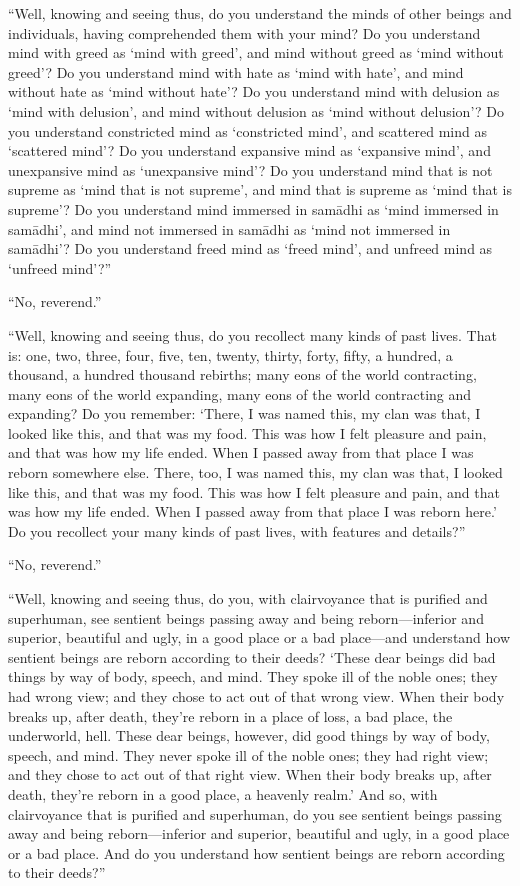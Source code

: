 \documentclass[12pt,openany]{book}%
\begin{document}
“Well, knowing and seeing thus, do you understand the minds of other beings and individuals, having comprehended them with your mind? Do you understand mind with greed as ‘mind with greed’, and mind without greed as ‘mind without greed’? Do you understand mind with hate as ‘mind with hate’, and mind without hate as ‘mind without hate’? Do you understand mind with delusion as ‘mind with delusion’, and mind without delusion as ‘mind without delusion’? Do you understand constricted mind as ‘constricted mind’, and scattered mind as ‘scattered mind’? Do you understand expansive mind as ‘expansive mind’, and unexpansive mind as ‘unexpansive mind’? Do you understand mind that is not supreme as ‘mind that is not supreme’, and mind that is supreme as ‘mind that is supreme’? Do you understand mind immersed in \textsanskrit{samādhi} as ‘mind immersed in \textsanskrit{samādhi}’, and mind not immersed in \textsanskrit{samādhi} as ‘mind not immersed in \textsanskrit{samādhi}’? Do you understand freed mind as ‘freed mind’, and unfreed mind as ‘unfreed mind’?” 

“No, reverend.” 

“Well, knowing and seeing thus, do you recollect many kinds of past lives. That is: one, two, three, four, five, ten, twenty, thirty, forty, fifty, a hundred, a thousand, a hundred thousand rebirths; many eons of the world contracting, many eons of the world expanding, many eons of the world contracting and expanding? Do you remember: ‘There, I was named this, my clan was that, I looked like this, and that was my food. This was how I felt pleasure and pain, and that was how my life ended. When I passed away from that place I was reborn somewhere else. There, too, I was named this, my clan was that, I looked like this, and that was my food. This was how I felt pleasure and pain, and that was how my life ended. When I passed away from that place I was reborn here.’ Do you recollect your many kinds of past lives, with features and details?” 

“No, reverend.” 

“Well, knowing and seeing thus, do you, with clairvoyance that is purified and superhuman, see sentient beings passing away and being reborn—inferior and superior, beautiful and ugly, in a good place or a bad place—and understand how sentient beings are reborn according to their deeds? ‘These dear beings did bad things by way of body, speech, and mind. They spoke ill of the noble ones; they had wrong view; and they chose to act out of that wrong view. When their body breaks up, after death, they’re reborn in a place of loss, a bad place, the underworld, hell. These dear beings, however, did good things by way of body, speech, and mind. They never spoke ill of the noble ones; they had right view; and they chose to act out of that right view. When their body breaks up, after death, they’re reborn in a good place, a heavenly realm.’ And so, with clairvoyance that is purified and superhuman, do you see sentient beings passing away and being reborn—inferior and superior, beautiful and ugly, in a good place or a bad place. And do you understand how sentient beings are reborn according to their deeds?” 
\end{document}
